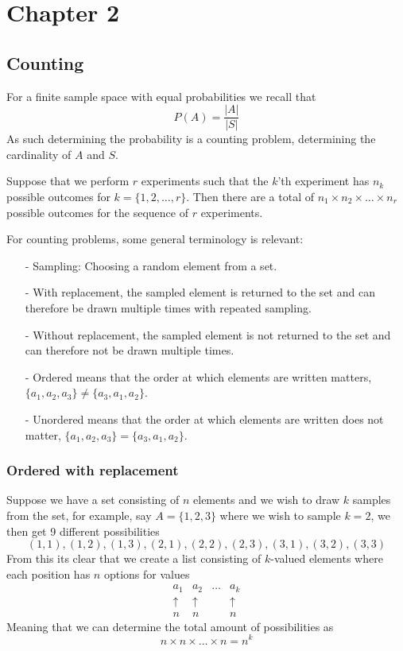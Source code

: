 \section{Chapter 2}
\subsection{Counting}
For a finite sample space with equal probabilities we recall that
\[
    P(A)=\frac{|A|}{|S|}
\]
As such determining the probability is a counting problem, determining the cardinality of $A$ and $S$.
\begin{definition}
    Suppose that we perform $r$ experiments such that the $k$'th experiment has $n_{k}$ possible outcomes for $k=\{1,2,\ldots,r\}$. Then there are a total of $n_{1}\times n_{2}\times\ldots\times n_{r}$ possible outcomes for the sequence of $r$ experiments.
\end{definition}
For counting problems, some general terminology is relevant:
\begin{itemize}
    \item[-] Sampling: Choosing a random element from a set.
    \item[-] With replacement, the sampled element is returned to the set and can therefore be drawn multiple times with repeated sampling.
    \item[-] Without replacement, the sampled element is not returned to the set and can therefore not be drawn multiple times.
    \item[-] Ordered means that the order at which elements are written matters, $\{a_{1},a_{2},a_{3}\}\neq \{a_{3},a_{1},a_{2}\}$.
    \item[-] Unordered means that the order at which elements are written does not matter, $\{a_{1},a_{2},a_{3}\}=\{a_{3},a_{1},a_{2}\}$.
\end{itemize}
\subsubsection{Ordered with replacement}
Suppose we have a set consisting of $n$ elements and we wish to draw $k$ samples from the set, for example, say $A=\{1,2,3\}$ where we wish to sample $k=2$, we then get 9 different possibilities
\[
    (1,1),(1,2),(1,3),(2,1),(2,2),(2,3),(3,1),(3,2),(3,3)
\]
From this its clear that we create a list consisting of $k$-valued elements where each position has $n$ options for values
\[\begin{array}{cccc}
    a_1 & a_2 & \ldots & a_k \\
    \uparrow & \uparrow & & \uparrow \\
    n & n & & n
 \end{array}\]
Meaning that we can determine the total amount of possibilities as 
\[
    n\times n\times\ldots\times n=n^{k}
\]
